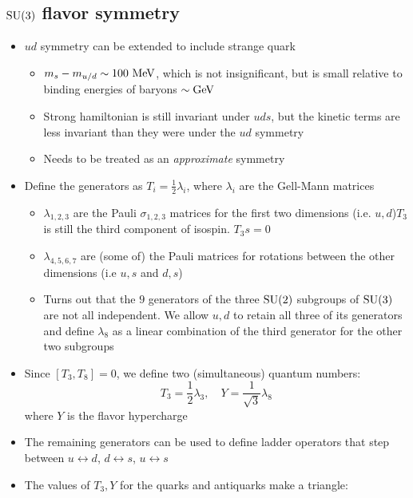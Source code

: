 \subsection{$\operatorname{SU}(3)$ flavor symmetry}
\begin{itemize}
  \item $ud$ symmetry can be extended to include strange quark
  \begin{itemize}
    \item $m_s - m_{u/d}\sim100~\text{MeV}$, which is not insignificant, but is small relative to binding energies of baryons $\sim\text{GeV}$
    \item Strong hamiltonian is still invariant under $uds$, but the kinetic terms are less invariant than they were under the $ud$ symmetry
    \item Needs to be treated as an \emph{approximate} symmetry
  \end{itemize}
  \item Define the generators as $T_i = \frac{1}{2}\lambda_i$, where $\lambda_i$ are the Gell-Mann matrices
  \begin{itemize}
    \item $\lambda_{1,2,3}$ are the Pauli $\sigma_{1,2,3}$ matrices for the first two dimensions (i.e. $u,d$)\thus $T_3$ is still the third component of isospin. $T_3s = 0$
    \item $\lambda_{4,5,6,7}$ are (some of) the Pauli matrices for rotations between the other dimensions (i.e $u,s$ and $d,s$)
    \item Turns out that the $9$ generators of the three $\operatorname{SU}(2)$ subgroups of $\operatorname{SU}(3)$ are not all independent. We allow $u,d$ to retain all three of its generators and define $\lambda_8$ as a linear combination of the third generator for the other two subgroups
  \end{itemize}
  \item Since $[T_3,T_8]=0$, we define two (simultaneous) quantum numbers:
  \begin{equation}
    T_3 = \frac{1}{2}\lambda_3,\quad Y = \frac{1}{\sqrt3}\lambda_8
  \end{equation}
  where $Y$ is the flavor hypercharge
  \item The remaining generators can be used to define ladder operators that step between $u\leftrightarrow d$, $d\leftrightarrow s$, $u\leftrightarrow s$
  \item The values of $T_3,Y$ for the quarks and antiquarks make a triangle:
\end{itemize}

